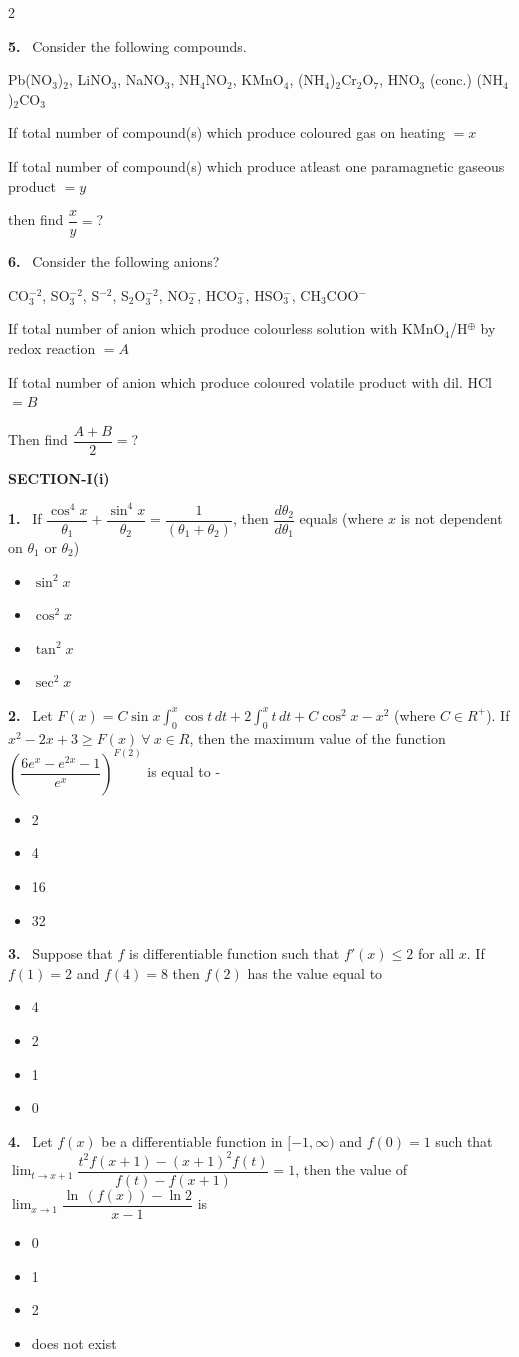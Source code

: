 \documentclass[10pt]{extarticle}
\newcommand{\partsec}[2]{\par\medskip\noindent{\large\bfseries PART-#1: #2}\par\smallskip}
\newcommand{\sect}[1]{\par\smallskip\noindent\textbf{#1}\par}
\newcommand{\qn}[1]{\par\smallskip\noindent\textbf{#1.}~}
\newenvironment{qoptions}{\begin{itemize}[leftmargin=1.8em,itemsep=1pt,topsep=2pt,label={}]}{\end{itemize}}
\newcommand{\opt}[2]{\item[(#1)] #2}
\begin{document}
\begin{multicols}{2}
\qn{5} Consider the following compounds.\par
Pb(NO$_3$)$_2$, LiNO$_3$, NaNO$_3$, NH$_4$NO$_2$, KMnO$_4$, (NH$_4$)$_2$Cr$_2$O$_7$, HNO$_3$ (conc.) (NH$_4$)$_2$CO$_3$\par
If total number of compound(s) which produce coloured gas on heating $=x$\par
If total number of compound(s) which produce atleast one paramagnetic gaseous product $=y$\par
then find $\dfrac{x}{y}=$?
\qn{6} Consider the following anions?\par
CO$_3^{-2}$, SO$_3^{-2}$, S$^{-2}$, S$_2$O$_3^{-2}$, NO$_2^-$, HCO$_3^-$, HSO$_3^-$, CH$_3$COO$^-$\par
If total number of anion which produce colourless solution with KMnO$_4$/H$^{\oplus}$ by redox reaction $=A$\par
If total number of anion which produce coloured volatile product with dil. HCl $=B$\par
Then find $\dfrac{A+B}{2}=$?
\raggedcolumns
\partsec{3}{MATHEMATICS}
\sect{SECTION-I(i)}
\qn{1} If $\dfrac{\cos^4x}{\theta_1}+\dfrac{\sin^4x}{\theta_2}=\dfrac{1}{(\theta_1+\theta_2)}$, then $\dfrac{d\theta_2}{d\theta_1}$ equals (where $x$ is not dependent on $\theta_1$ or $\theta_2$)
\begin{qoptions}
\opt{A}{$\sin^2x$}
\opt{B}{$\cos^2x$}
\opt{C}{$\tan^2x$}
\opt{D}{$\sec^2x$}
\end{qoptions}
\qn{2} Let $F(x)=C\sin x\displaystyle\int_0^x\cos t\,dt+2\int_0^x t\,dt+C\cos^2x-x^2$ (where $C\in R^+$). If $x^2-2x+3\ge F(x)\ \forall\ x\in R$, then the maximum value of the function $\left(\dfrac{6e^x-e^{2x}-1}{e^x}\right)^{F(2)}$ is equal to -
\begin{qoptions}
\opt{A}{2}
\opt{B}{4}
\opt{C}{16}
\opt{D}{32}
\end{qoptions}
\qn{3} Suppose that $f$ is differentiable function such that $f'(x)\le2$ for all $x$. If $f(1)=2$ and $f(4)=8$ then $f(2)$ has the value equal to
\begin{qoptions}
\opt{A}{4}
\opt{B}{2}
\opt{C}{1}
\opt{D}{0}
\end{qoptions}
\qn{4} Let $f(x)$ be a differentiable function in $[-1,\infty)$ and $f(0)=1$ such that $\displaystyle\lim_{t\to x+1}\dfrac{t^2f(x+1)-(x+1)^2f(t)}{f(t)-f(x+1)}=1$, then the value of $\displaystyle\lim_{x\to1}\dfrac{\ln\,(f(x))-\ln2}{x-1}$ is
\begin{qoptions}
\opt{A}{0}
\opt{B}{1}
\opt{C}{2}
\opt{D}{does not exist}
\end{qoptions}

\end{multicols}
\end{document}

